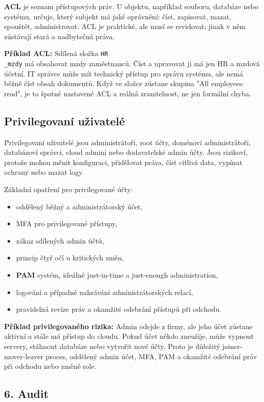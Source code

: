 \documentclass[11pt,a4paper]{article}
\newcommand{\itpr}[1]{\medskip\noindent\colorbox{green!8}{\parbox{\dimexpr\linewidth-2\fboxsep}{#1}}\medskip}
\begin{document}
\textbf{ACL} je seznam přístupových práv. U objektu, například souboru, databáze nebo systému, určuje, který subjekt má jaké oprávnění: číst, zapisovat, mazat, spouštět, administrovat. ACL je praktické, ale musí se revidovat; jinak v něm zůstávají stará a nadbytečná práva.

\itpr{\textbf{Příklad ACL:} Sdílená složka \texttt{HR\\_mzdy} má obsahovat mzdy zaměstnanců. Číst a upravovat ji má jen HR a mzdová účetní. IT správce může mít technický přístup pro správu systému, ale nemá běžně číst obsah dokumentů. Když ve složce zůstane skupina "All employees: read", je to špatně nastavené ACL a reálná zranitelnost, ne jen formální chyba.}

\subsection*{Privilegovaní uživatelé}

Privilegovaní uživatelé jsou administrátoři, root účty, doménoví administrátoři, databázoví správci, cloud admini nebo dodavatelské admin účty. Jsou rizikoví, protože mohou měnit konfiguraci, přidělovat práva, číst citlivá data, vypínat ochrany nebo mazat logy.

Základní opatření pro privilegované účty:
\begin{itemize}
    \item oddělený běžný a administrátorský účet,
    \item MFA pro privilegované přístupy,
    \item zákaz sdílených admin účtů,
    \item princip čtyř očí u kritických změn,
    \item \textbf{PAM} systém, ideálně just-in-time a just-enough administration,
    \item logování a případně nahrávání administrátorských relací,
    \item pravidelná revize práv a okamžité odebrání přístupů při odchodu.
\end{itemize}

\itpr{\textbf{Příklad privilegovaného rizika:} Admin odejde z firmy, ale jeho účet zůstane aktivní a stále má přístup do cloudu. Pokud účet někdo zneužije, může vypnout servery, stáhnout databáze nebo vytvořit nové účty. Proto je důležitý joiner-mover-leaver proces, oddělený admin účet, MFA, PAM a okamžité odebrání práv při odchodu nebo změně role.}

\subsection*{6. Audit}
\end{document}
